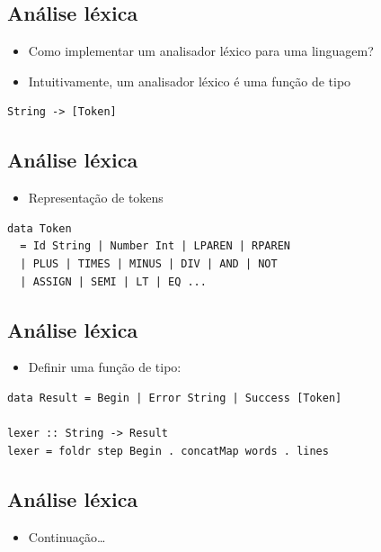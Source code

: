 \documentclass[11pt]{article}
\begin{document}
\subsection*{Análise léxica}
\label{sec:orgfeaa30b}

\begin{itemize}
\item Como implementar um analisador léxico para uma linguagem?

\item Intuitivamente, um analisador léxico é uma função de tipo
\end{itemize}

\begin{verbatim}
String -> [Token]
\end{verbatim}
\subsection*{Análise léxica}
\label{sec:orgb35bb08}

\begin{itemize}
\item Representação de tokens
\end{itemize}

\begin{verbatim}
data Token
  = Id String | Number Int | LPAREN | RPAREN
  | PLUS | TIMES | MINUS | DIV | AND | NOT 
  | ASSIGN | SEMI | LT | EQ ...
\end{verbatim}
\subsection*{Análise léxica}
\label{sec:orgeb04cbf}

\begin{itemize}
\item Definir uma função de tipo:
\end{itemize}

\begin{verbatim}
data Result = Begin | Error String | Success [Token]
 
lexer :: String -> Result
lexer = foldr step Begin . concatMap words . lines
\end{verbatim}
\subsection*{Análise léxica}
\label{sec:orgc4d0bac}

\begin{itemize}
\item Continuação\ldots{}
\end{itemize}
\end{document}
